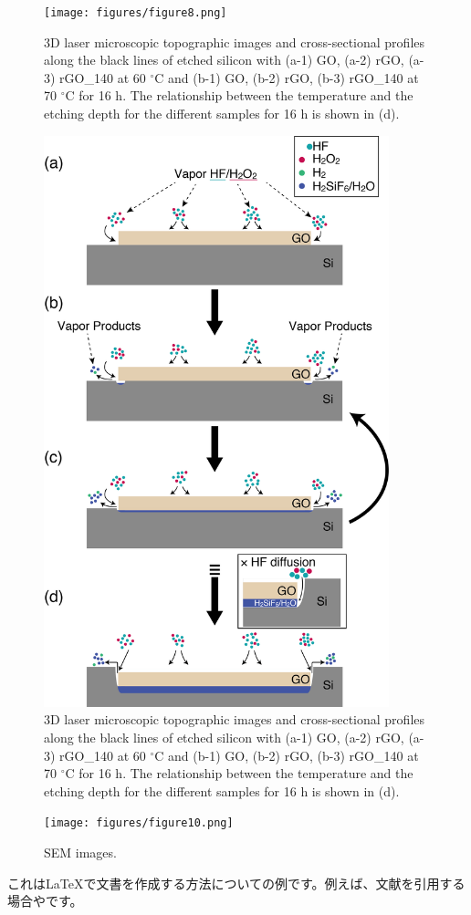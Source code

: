 \documentclass[platex,dvipdfmx]{jlreq}			%
\begin{document}
\begin{figure}[H]
    \centering
    \texttt{[image: figures/figure8.png]}
    \caption{3D laser microscopic topographic images and cross-sectional profiles along the black lines of etched silicon with (a-1) GO, (a-2) rGO, (a-3) rGO\_140 at 60 ${}^\circ$C and (b-1) GO, (b-2) rGO, (b-3) rGO\_140 at 70 ${}^\circ$C for 16 h. The relationship between the temperature and the etching depth for the different samples for 16 h is shown in (d).}
    \label{fig:Etching_temp}
\end{figure}

\begin{figure}[H]
    \centering
    \includegraphics[width=100mm]{figures/figure9.png}
    \caption{3D laser microscopic topographic images and cross-sectional profiles along the black lines of etched silicon with (a-1) GO, (a-2) rGO, (a-3) rGO\_140 at 60 ${}^\circ$C and (b-1) GO, (b-2) rGO, (b-3) rGO\_140 at 70 ${}^\circ$C for 16 h. The relationship between the temperature and the etching depth for the different samples for 16 h is shown in (d).}
    \label{fig:Schematic_mechanism}
\end{figure}

\begin{figure}[H]
    \centering
    \texttt{[image: figures/figure10.png]}
    \caption{SEM images.}
    \label{fig:SEM}
\end{figure}



これは\LaTeX{}で文書を作成する方法についての例です。例えば、文献を引用する場合\supercite{tanaka2020}や\cite{suzuki2018}です。
\printbibliography
\end{document}
